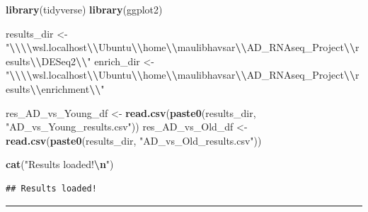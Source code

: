\documentclass[
]{article}
\newenvironment{Shaded}{\begin{snugshade}}{\end{snugshade}}
\newcommand{\FunctionTok}[1]{\textcolor[rgb]{0.13,0.29,0.53}{\textbf{#1}}}
\newcommand{\NormalTok}[1]{#1}
\newcommand{\OtherTok}[1]{\textcolor[rgb]{0.56,0.35,0.01}{#1}}
\newcommand{\SpecialCharTok}[1]{\textcolor[rgb]{0.81,0.36,0.00}{\textbf{#1}}}
\newcommand{\StringTok}[1]{\textcolor[rgb]{0.31,0.60,0.02}{#1}}
\begin{document}
\begin{Shaded}
\begin{Highlighting}[]
\FunctionTok{library}\NormalTok{(tidyverse)}
\FunctionTok{library}\NormalTok{(ggplot2)}

\NormalTok{results\_dir }\OtherTok{\textless{}{-}} \StringTok{"}\SpecialCharTok{\textbackslash{}\textbackslash{}\textbackslash{}\textbackslash{}}\StringTok{wsl.localhost}\SpecialCharTok{\textbackslash{}\textbackslash{}}\StringTok{Ubuntu}\SpecialCharTok{\textbackslash{}\textbackslash{}}\StringTok{home}\SpecialCharTok{\textbackslash{}\textbackslash{}}\StringTok{maulibhavsar}\SpecialCharTok{\textbackslash{}\textbackslash{}}\StringTok{AD\_RNAseq\_Project}\SpecialCharTok{\textbackslash{}\textbackslash{}}\StringTok{results}\SpecialCharTok{\textbackslash{}\textbackslash{}}\StringTok{DESeq2}\SpecialCharTok{\textbackslash{}\textbackslash{}}\StringTok{"}
\NormalTok{enrich\_dir  }\OtherTok{\textless{}{-}} \StringTok{"}\SpecialCharTok{\textbackslash{}\textbackslash{}\textbackslash{}\textbackslash{}}\StringTok{wsl.localhost}\SpecialCharTok{\textbackslash{}\textbackslash{}}\StringTok{Ubuntu}\SpecialCharTok{\textbackslash{}\textbackslash{}}\StringTok{home}\SpecialCharTok{\textbackslash{}\textbackslash{}}\StringTok{maulibhavsar}\SpecialCharTok{\textbackslash{}\textbackslash{}}\StringTok{AD\_RNAseq\_Project}\SpecialCharTok{\textbackslash{}\textbackslash{}}\StringTok{results}\SpecialCharTok{\textbackslash{}\textbackslash{}}\StringTok{enrichment}\SpecialCharTok{\textbackslash{}\textbackslash{}}\StringTok{"}

\NormalTok{res\_AD\_vs\_Young\_df  }\OtherTok{\textless{}{-}} \FunctionTok{read.csv}\NormalTok{(}\FunctionTok{paste0}\NormalTok{(results\_dir, }\StringTok{"AD\_vs\_Young\_results.csv"}\NormalTok{))}
\NormalTok{res\_AD\_vs\_Old\_df    }\OtherTok{\textless{}{-}} \FunctionTok{read.csv}\NormalTok{(}\FunctionTok{paste0}\NormalTok{(results\_dir, }\StringTok{"AD\_vs\_Old\_results.csv"}\NormalTok{))}

\FunctionTok{cat}\NormalTok{(}\StringTok{"Results loaded!}\SpecialCharTok{\textbackslash{}n}\StringTok{"}\NormalTok{)}
\end{Highlighting}
\end{Shaded}

\begin{verbatim}
## Results loaded!
\end{verbatim}

\begin{center}\rule{0.5\linewidth}{0.5pt}\end{center}
\end{document}
